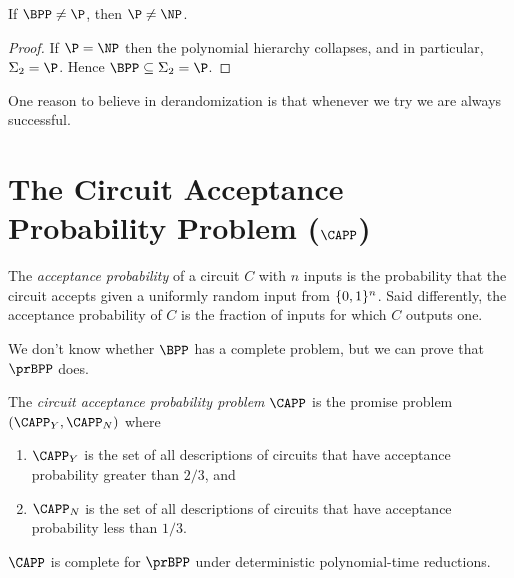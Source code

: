 \begin{proposition}
	If $\BPP \neq \P$, then $\P \neq \NP$.
\end{proposition}
\begin{proof}
  If $\P = \NP$ then the polynomial hierarchy collapses, and in particular,
  $\Sigma_2 = \P$. Hence $\BPP \subseteq \Sigma_2 = \P$.
\end{proof}

One reason to believe in derandomization is that whenever we try we are always
successful. 

\section{The Circuit Acceptance Probability Problem (\texorpdfstring{$\CAPP$}{CAPP})}

The \emph{acceptance probability} of a circuit $C$ with $n$ inputs is the probability that the circuit accepts given a uniformly random input from $\{0, 1\}^n$. Said differently, the acceptance probability of $C$ is the fraction of inputs for which $C$ outputs one. 


We don't know whether $\BPP$ has a complete problem, but we can prove that $\prBPP$ does.

\begin{definition}
  The \emph{circuit acceptance probability problem} $\CAPP$ is the promise problem $(\CAPP_Y, \CAPP_N)$ where
  \begin{enumerate}
    \item $\CAPP_Y$ is the set of all descriptions of circuits that have
      acceptance probability greater than $2/3$, and
    \item $\CAPP_N$ is the set of all descriptions of circuits that have
      acceptance probability less than $1/3$.
  \end{enumerate}
\end{definition}

\begin{theorem}\label{thm:complete}
  $\CAPP$ is complete for $\prBPP$ under deterministic polynomial-time reductions.
\end{theorem}

